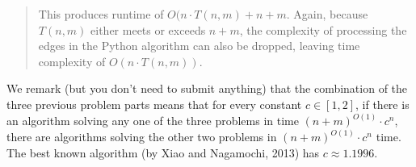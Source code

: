 \documentclass[11pt]{article}
\begin{document}
\begin{enumerate}
\begin{enumerate}
\begin{quote}
    This produces runtime of $O(n \cdot T(n, m) + n + m$. Again, because $T(n, m)$ either meets or exceeds $n + m$, the complexity of processing the edges in the Python algorithm can also be dropped, leaving time complexity of $O(n \cdot T(n, m))$. \\
\end{quote}

 \end{enumerate}
 We remark (but you don't need to submit anything) that the combination of the three previous problem parts means that for every constant $c\in [1,2]$, if there is an algorithm solving any one of the three problems in time $(n+m)^{O(1)}\cdot c^n$, there are algorithms solving the other two problems in $(n+m)^{O(1)}\cdot c^n$ time.  The best known algorithm (by Xiao and Nagamochi, 2013) has $c \approx 1.1996$.
 
\end{enumerate}
\end{document}
